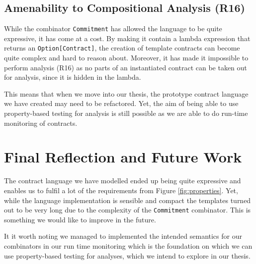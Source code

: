 \documentclass{ituthesis}
\begin{document}
\subsection{Amenability to Compositional Analysis (R16)}
While the combinator \texttt{Commitment} has allowed the language to be quite expressive, it has come at a cost. By making it contain a lambda expression that returns an \texttt{Option[Contract]}, the creation of template contracts can become quite complex and hard to reason about. Moreover, it has made it impossible to perform analysis (R16) as no parts of an instantiated contract can be taken out for analysis, since it is hidden in the lambda.

This means that when we move into our thesis, the prototype contract language we have created may need to be refactored. Yet, the aim of being able to use property-based testing for analysis is still possible as we are able to do run-time monitoring of contracts.

\section{Final Reflection and Future Work}
The contract language we have modelled ended up being quite expressive and enables us to fulfil a lot of the requirements from Figure \ref{fig:properties}. Yet, while the language implementation is sensible and compact the templates turned out to be very long due to the complexity of the \texttt{Commitment} combinator. This is something we would like to improve in the future.

It it worth noting we managed to implemented the intended semantics for our combinators in our run time monitoring which is the foundation on which we can use property-based testing for analyses, which we intend to explore in our thesis.
\end{document}
